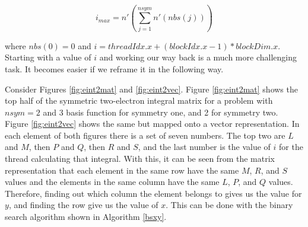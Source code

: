 \begin{equation}
\label{imax}
i_{max} = n'(\sum^{nsym}_{j = 1}n'(nbs(j)))
\end{equation}

where $nbs(0) = 0$ and $i=threadIdx.x + (blockIdx.x - 1) * blockDim.x$. Starting with a value of $i$ and working our way back is a much more challenging task. It becomes easier if we reframe it in the following way.

\clearpage

Consider Figures \ref{fig:eint2mat} and \ref{fig:eint2vec}. Figure \ref{fig:eint2mat} shows the top half of the symmetric two-electron integral matrix for a problem with $nsym = 2$ and 3 basis function for symmetry one, and 2 for symmetry two. Figure \ref{fig:eint2vec} shows the same but mapped onto a vector representation. In each element of both figures there is a set of seven numbers. The top two are $L$ and $M$, then $P$ and $Q$, then $R$ and $S$, and the last number is the value of $i$ for the thread calculating that integral. With this, it can be seen from the matrix representation that each element in the same row have the same $M$, $R$, and $S$ values and the elements in the same column have the same $L$, $P$, and $Q$ values. Therefore, finding out which column the element belongs to gives us the value for $y$, and finding the row give us the value of $x$. This can be done with the binary search algorithm shown in Algorithm \ref{bsxy}.

